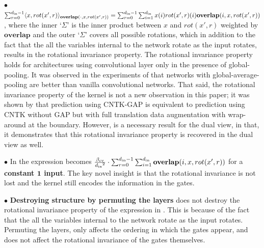 $\bullet$ $\sum_{r=0}^{d_{\text{in}}-1} \langle x,rot(x',r)\rangle_{\textbf{overlap}(\cdot, x,rot(x',r))}=\sum_{r=0}^{d_{\text{in}}-1}\sum_{i=1}^{d_{\text{in}}} x(i) rot(x',r)(i)\textbf{overlap}(i,x,rot(x',r))$, where the inner `$\Sigma$' is the inner product between $x$ and $rot(x',r)$ weighted by $\textbf{overlap}$ and the outer `$\Sigma$' covers all possible rotations, which in addition to the fact that the all the variables internal to the network rotate as the input rotates, results in the rotational invariance property. The rotational invariance property holds for architectures using convolutional layer only in the presence of global-pooling. It was observed in the experiments of \cite{arora2019exact} that networks with global-average-pooling are better than vanilla convolutional networks. That said, the rotational invariance property of the kernel is not a new observation in this paper; it was shown by \cite{li2019enhanced} that  prediction using CNTK-GAP is equivalent to prediction using CNTK without GAP but with full translation data augmentation with wrap-around at the boundary. However,  is a necessary result for the dual view, in that, it demonstrates that this rotational invariance property is recovered in the dual view as well. 

$\bullet$ In  the expression becomes $\frac{\beta_{\text{cv}}}{{d_{\text{in}}}^2} \cdot \sum_{r=0}^{d_{\text{in}}-1}\sum_{i=1}^{d_{\text{in}}} \textbf{overlap}(i,x,rot(x',r))$ for a  \textbf{constant $\mathbf{1}$ input}. The key novel insight is that the rotational invariance is not lost and the kernel still encodes the information in the gates. 

$\bullet$ \textbf{Destroying structure by permuting the layers}  does not destroy the rotational invariance property of the expression in . This is because of the fact that the all the variables internal to the network rotate as the input rotates. Permuting the layers, only affects the ordering in which the gates appear, and does not affect the rotational invariance of the gates themselves.

